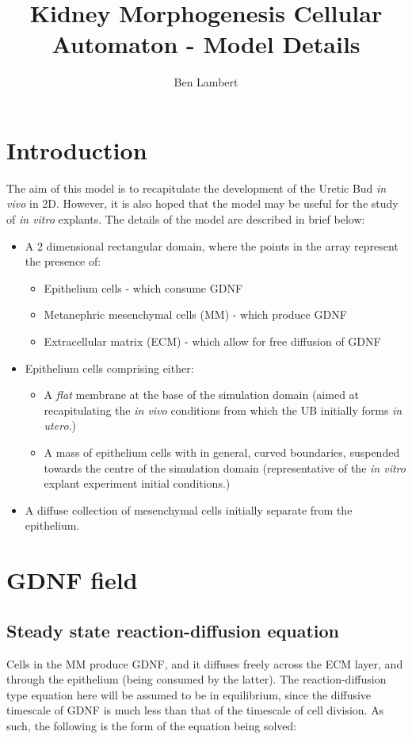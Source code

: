 \documentclass[pdftex,10pt,a4paper]{article}
\title{\textbf{Kidney Morphogenesis Cellular Automaton - Model Details}\newline }
\author{Ben Lambert}
\begin{document}
\maketitle
\doublespacing
\section{Introduction}
The aim of this model is to recapitulate the development of the Uretic Bud \textit{in vivo} in 2D. However, it is also hoped that the model may be useful for the study of \textit{in vitro} explants. The details of the model are described in brief below:
\begin{itemize}
\item A 2 dimensional rectangular domain, where the points in the array represent the presence of:
\begin{itemize}
\item Epithelium cells - which consume GDNF
\item Metanephric mesenchymal cells (MM) - which produce GDNF
\item Extracellular matrix (ECM) - which allow for free diffusion of GDNF
\end{itemize}
\item Epithelium cells comprising either:
\begin{itemize}
\item A \textit{flat} membrane at the base of the simulation domain (aimed at recapitulating the \textit{in vivo} conditions from which the UB initially forms \textit{in utero}.)
\item A mass of epithelium cells with in general, curved boundaries, suspended towards the centre of the simulation domain (representative of the \textit{in vitro} explant experiment initial conditions.)
\end{itemize}
\item A diffuse collection of mesenchymal cells initially separate from the epithelium.
\end{itemize}

\section{GDNF field}
\subsection{Steady state reaction-diffusion equation}
Cells in the MM produce GDNF, and it diffuses freely across the ECM layer, and through the epithelium (being consumed by the latter). The reaction-diffusion type equation here will be assumed to be in equilibrium, since the diffusive timescale of GDNF is much less than that of the timescale of cell division. As such, the following is the form of the equation being solved:
\end{document}
